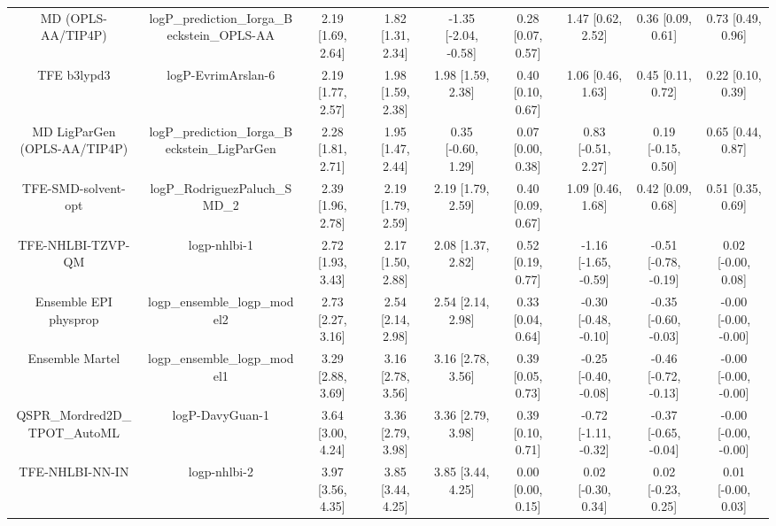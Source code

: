 \documentclass{article}
\begin{document}
\begin{center}
\begin{longtable}{|ccccccccc|}
           MD (OPLS-AA/TIP4P) &    logP\_prediction\_Iorga\_Beckstein\_OPLS-AA &  2.19 [1.69, 2.64] &  1.82 [1.31, 2.34] &  -1.35 [-2.04, -0.58] &  0.28 [0.07, 0.57] &     1.47 [0.62, 2.52] &     0.36 [0.09, 0.61] &     0.73 [0.49, 0.96] \\
                  TFE b3lypd3 &                             logP-EvrimArslan-6 &  2.19 [1.77, 2.57] &  1.98 [1.59, 2.38] &     1.98 [1.59, 2.38] &  0.40 [0.10, 0.67] &     1.06 [0.46, 1.63] &     0.45 [0.11, 0.72] &     0.22 [0.10, 0.39] \\
 MD LigParGen (OPLS-AA/TIP4P) &  logP\_prediction\_Iorga\_Beckstein\_LigParGen &  2.28 [1.81, 2.71] &  1.95 [1.47, 2.44] &    0.35 [-0.60, 1.29] &  0.07 [0.00, 0.38] &    0.83 [-0.51, 2.27] &    0.19 [-0.15, 0.50] &     0.65 [0.44, 0.87] \\
          TFE-SMD-solvent-opt &                  logP\_RodriguezPaluch\_SMD\_2 &  2.39 [1.96, 2.78] &  2.19 [1.79, 2.59] &     2.19 [1.79, 2.59] &  0.40 [0.09, 0.67] &     1.09 [0.46, 1.68] &     0.42 [0.09, 0.68] &     0.51 [0.35, 0.69] \\
            TFE-NHLBI-TZVP-QM &                                   logp-nhlbi-1 &  2.72 [1.93, 3.43] &  2.17 [1.50, 2.88] &     2.08 [1.37, 2.82] &  0.52 [0.19, 0.77] &  -1.16 [-1.65, -0.59] &  -0.51 [-0.78, -0.19] &    0.02 [-0.00, 0.08] \\
        Ensemble EPI physprop &                   logp\_ensemble\_logp\_model2 &  2.73 [2.27, 3.16] &  2.54 [2.14, 2.98] &     2.54 [2.14, 2.98] &  0.33 [0.04, 0.64] &  -0.30 [-0.48, -0.10] &  -0.35 [-0.60, -0.03] &  -0.00 [-0.00, -0.00] \\
              Ensemble Martel &                   logp\_ensemble\_logp\_model1 &  3.29 [2.88, 3.69] &  3.16 [2.78, 3.56] &     3.16 [2.78, 3.56] &  0.39 [0.05, 0.73] &  -0.25 [-0.40, -0.08] &  -0.46 [-0.72, -0.13] &  -0.00 [-0.00, -0.00] \\
   QSPR_Mordred2D_TPOT_AutoML &                                logP-DavyGuan-1 &  3.64 [3.00, 4.24] &  3.36 [2.79, 3.98] &     3.36 [2.79, 3.98] &  0.39 [0.10, 0.71] &  -0.72 [-1.11, -0.32] &  -0.37 [-0.65, -0.04] &  -0.00 [-0.00, -0.00] \\
              TFE-NHLBI-NN-IN &                                   logp-nhlbi-2 &  3.97 [3.56, 4.35] &  3.85 [3.44, 4.25] &     3.85 [3.44, 4.25] &  0.00 [0.00, 0.15] &    0.02 [-0.30, 0.34] &    0.02 [-0.23, 0.25] &    0.01 [-0.00, 0.03] \\
\end{longtable}
\end{center}
\end{document}
